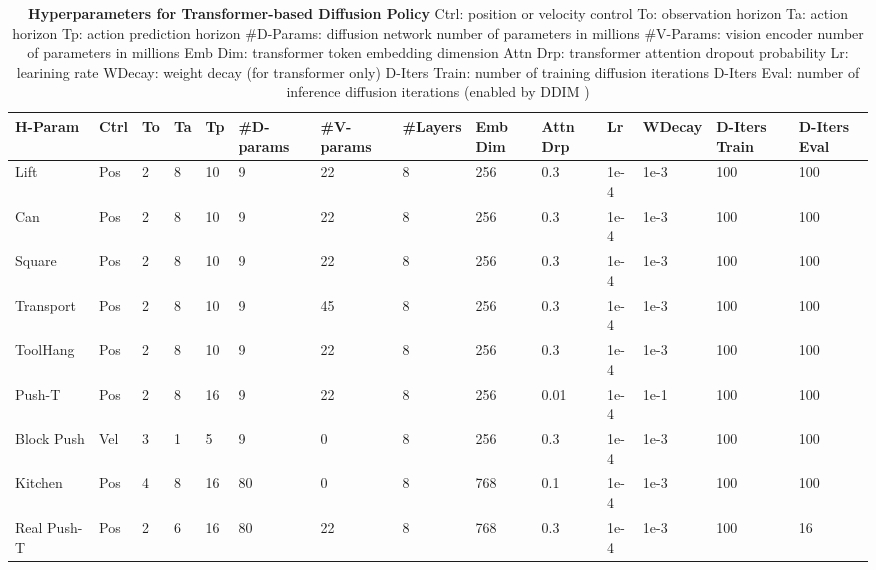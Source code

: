 \documentclass[Afour,sageh,times]{sagej}
\begin{document}
\begin{table}
\vspace{4mm}
\centering
\setlength\tabcolsep{2.1 pt}
\begin{tabular}{l|lllllllllllll}
\toprule
\textbf{H-Param} & \textbf{Ctrl} & \textbf{To} & \textbf{Ta} & \textbf{Tp} & \textbf{\#D-params} & \textbf{\#V-params} & \textbf{\#Layers} & \textbf{Emb Dim} & \textbf{Attn Drp} & \textbf{Lr} & \textbf{WDecay} & \textbf{D-Iters Train} & \textbf{D-Iters Eval} \\

\midrule
Lift       & Pos  & 2  & 8  & 10 & 9        & 22       & 8      & 256     & 0.3          & 1e-4 & 1e-3   & 100           & 100          \\
Can        & Pos  & 2  & 8  & 10 & 9        & 22       & 8      & 256     & 0.3          & 1e-4 & 1e-3   & 100           & 100          \\
Square     & Pos  & 2  & 8  & 10 & 9        & 22       & 8      & 256     & 0.3          & 1e-4 & 1e-3   & 100           & 100          \\
Transport  & Pos  & 2  & 8  & 10 & 9        & 45       & 8      & 256     & 0.3          & 1e-4 & 1e-3   & 100           & 100          \\
ToolHang   & Pos  & 2  & 8  & 10 & 9        & 22       & 8      & 256     & 0.3          & 1e-4 & 1e-3   & 100           & 100          \\
Push-T     & Pos  & 2  & 8  & 16 & 9        & 22       & 8      & 256     & 0.01         & 1e-4 & 1e-1   & 100           & 100          \\
Block Push & Vel  & 3  & 1  & 5  & 9        & 0        & 8      & 256     & 0.3          & 1e-4 & 1e-3   & 100           & 100          \\
Kitchen    & Pos  & 4  & 8  & 16 & 80       & 0        & 8      & 768     & 0.1          & 1e-4 & 1e-3   & 100           & 100          \\
\midrule
Real Push-T     & Pos  & 2  & 6  & 16 & 80      & 22       & 8      & 768     & 0.3          & 1e-4 & 1e-3   & 100           & 16           \\
\bottomrule
\end{tabular}%
\caption{
\textbf{Hyperparameters for Transformer-based Diffusion Policy}
\label{tab:hparam_transformer}
Ctrl: position or velocity control
To: observation horizon
Ta: action horizon
Tp: action prediction horizon
\#D-Params: diffusion network number of parameters in millions
\#V-Params: vision encoder number of parameters in millions
Emb Dim: transformer token embedding dimension
Attn Drp: transformer attention dropout probability
Lr: learining rate
WDecay: weight decay (for transformer only)
D-Iters Train: number of training diffusion iterations
D-Iters Eval: number of inference diffusion iterations (enabled by DDIM \cite{song2021ddim})
}
\vspace{-5mm}
\end{table}
\end{document}
